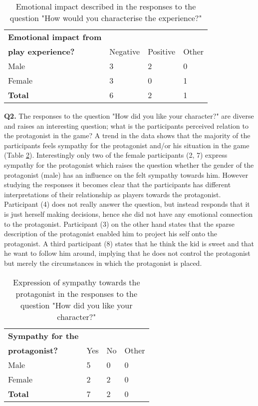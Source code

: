 \begin{table}[h]
\centering
\begin{tabular}{l l l l}
\hline
\textbf{Emotional impact from}\\
\textbf{play experience?} & Negative & Positive & Other \\
\hline
Male & 3 & 2 & 0 \\
Female & 3 & 0 & 1 \\
\textbf{Total} & 6 & 2 & 1 \\
\hline
\end{tabular}
\caption{\label{tab:emo}Emotional impact described in the responses to the question "How would you characterise the experience?"}
\end{table}

\textbf{Q2.} The responses to the question "How did you like your character?" are diverse and raises an interesting question; what is the participants perceived relation to the protagonist in the game? A trend in the data shows that the majority of the participants feels sympathy for the protagonist and/or his situation in the game (Table \ref{tab:symp}). Interestingly only two of the female participants (2, 7) express sympathy for the protagonist which raises the question whether the gender of the protagonist (male) has an influence on the felt sympathy towards him. However studying the responses it becomes clear that the participants has different interpretations of their relationship as players towards the protagonist. Participant (4) does not really answer the question, but instead responds that it is just herself making decisions, hence she did not have any emotional connection to the protagonist. Participant (3) on the other hand states that the sparse description of the protagonist enabled him to project his self onto the protagonist. A third participant (8) states that he think the kid is sweet and that he want to follow him around, implying that he does not control the protagonist but merely the circumstances in which the protagonist is placed.

\begin{table}[h]
\centering
\begin{tabular}{l l l l}
\hline
\textbf{Sympathy for the}\\
\textbf{protagonist?} & Yes & No & Other \\
\hline
Male & 5 & 0 & 0 \\
Female & 2 & 2 & 0 \\
\textbf{Total} & 7 & 2 & 0 \\
\hline
\end{tabular}
\caption{\label{tab:symp}Expression of sympathy towards the protagonist in the responses to the question "How did you like your character?"}
\end{table}


